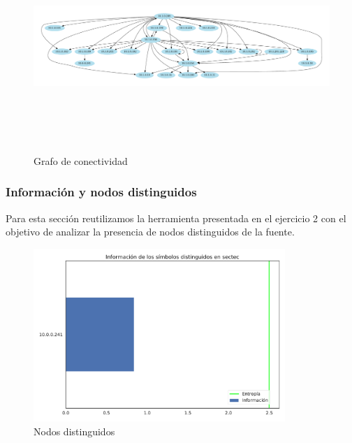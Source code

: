 \begin{figure}[H]
   \centering
       \includegraphics[page=1,height=8cm ,width=1.08\textwidth]{../img/red-sectec}
 \caption{Grafo de conectividad}
 \label{fig:grafo-sectec}
\end{figure}


\subsubsection{Información y nodos distinguidos}


Para esta sección reutilizamos la herramienta presentada en el ejercicio 2 con el objetivo de analizar la presencia de nodos distinguidos de la fuente. \\

\begin{figure}[H]
    \centering
    \includegraphics[page=1, height=6.55cm ,width=\textwidth]{../img/distinguidos-sectec}
    \caption{Nodos distinguidos}
    \label{fig:distinguidos-sectec}
\end{figure}
